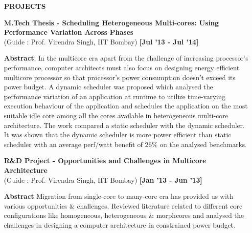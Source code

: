 \documentclass[a4paper,10pt]{article}
\begin{document}
\colorbox{titleColor}{\parbox{6.7in}{\textbf{PROJECTS}}}

\begin{itemize*}
  \setlength{\itemsep}{1pt}
  \item \textbf{M.Tech Thesis - Scheduling Heterogeneous Multi-cores: Using Performance Variation Across Phases}  \\
  {(Guide : Prof. Virendra Singh, IIT Bombay)} \hfill {\small{{\textbf{[Jul '13 - Jul '14]}}\/}}
  \begin{itemize*}
    \setlength{\itemsep}{.00pt}
    \item \textbf{Abstract}: In the multicore era apart from the challenge of increasing processor's performance, computer architects must also focus on designing energy efficient multicore processor so that processor's power consumption doesn't exceed its power budget. A dynamic scheduler was proposed which analysed the performance variation of an application at runtime to utilize time-varying execution behaviour of the application and schedules the application on the most suitable idle core among all the cores available in heterogeneous multi-core architecture. The work compared a static scheduler with the dynamic scheduler. It was shown that the dynamic scheduler is more power efficient than static scheduler with an average perf/watt benefit of 26\% on the analysed benchmarks.

  \end{itemize*}
\end{itemize*}

\begin{itemize*}
  \setlength{\itemsep}{1pt}
  \item \textbf{R\&D Project - Opportunities and Challenges in Multicore Architecture} \\
  {(Guide : Prof. Virendra Singh, IIT Bombay)}  \hfill {\small{{\textbf{[Jan '13 - Jun '13]}}\/}}
  \begin{itemize*}

    \setlength{\itemsep}{.00pt}
    \item \textbf{Abstract} Migration from single-core to many-core era has provided us with various opportunities \& challenges. Reviewed literature related to different core configurations like homogeneous, heterogeneous \& morphcores and analysed the challenges in designing a computer architecture in constrained power budget.
  \end{itemize*}
\end{itemize*}
\end{document}
